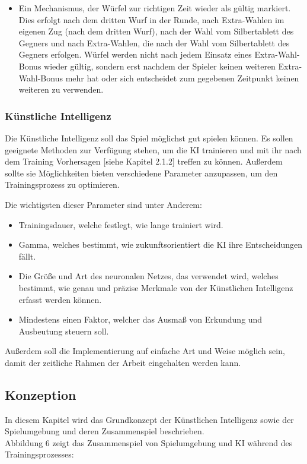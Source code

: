 \begin{itemize}
\item Ein Mechanismus, der Würfel zur richtigen Zeit wieder als gültig markiert. Dies erfolgt nach dem dritten Wurf in der Runde, nach Extra-Wahlen im eigenen Zug (nach dem dritten Wurf), nach der Wahl vom Silbertablett des Gegners und nach Extra-Wahlen, die nach der Wahl vom Silbertablett des Gegners erfolgen. Würfel werden nicht nach jedem Einsatz eines Extra-Wahl-Bonus wieder gültig, sondern erst nachdem der Spieler keinen weiteren Extra-Wahl-Bonus mehr hat oder sich entscheidet zum gegebenen Zeitpunkt keinen weiteren zu verwenden.
\end{itemize}
\subsubsection{Künstliche Intelligenz}
Die Künstliche Intelligenz soll das Spiel möglichst gut spielen können. Es sollen geeignete Methoden zur Verfügung stehen, um die KI trainieren und mit ihr nach dem Training Vorhersagen [siehe Kapitel 2.1.2] treffen zu können. Außerdem sollte sie Möglichkeiten bieten verschiedene Parameter anzupassen, um den Trainingsprozess zu optimieren.

Die wichtigsten dieser Parameter sind unter Anderem:
\begin{itemize} 
\item Trainingsdauer, welche festlegt, wie lange trainiert wird.
\item Gamma, welches bestimmt, wie zukunftsorientiert die KI ihre Entscheidungen fällt. 
\item Die Größe und Art des neuronalen Netzes, das verwendet wird, welches bestimmt, wie genau und präzise Merkmale von der Künstlichen Intelligenz erfasst werden können.
\item Mindestens einen Faktor, welcher das Ausmaß von Erkundung und Ausbeutung steuern soll. 
\end{itemize}
Außerdem soll die Implementierung auf einfache Art und Weise möglich sein, damit der zeitliche Rahmen der Arbeit eingehalten werden kann.
\subsection{Konzeption}
In diesem Kapitel wird das Grundkonzept der Künstlichen Intelligenz sowie der Spielumgebung und deren Zusammenspiel beschrieben.\\

Abbildung 6 zeigt das Zusammenspiel von Spielumgebung und KI während des Trainingsprozesses:

